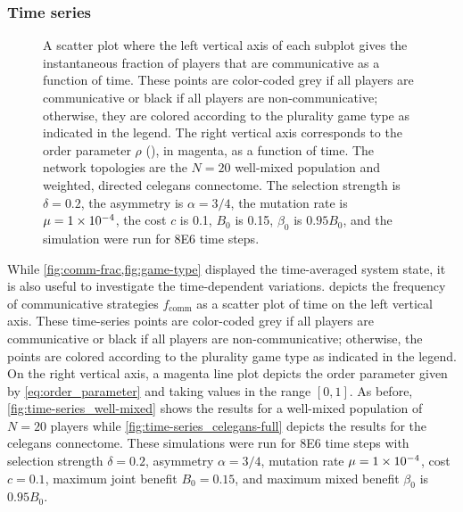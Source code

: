 \documentclass[pdflatex,lineno,referee,sn-mathphys-ay]{sn-jnl}
\begin{document}
\subsubsection{Time series}
\begin{figure}
  \centering
  
  \caption{
    A scatter plot where
    the left vertical axis of each subplot gives
    the instantaneous fraction of players that are communicative
    as a function of time.
    These points are color-coded
    grey if all players are communicative or
    black if all players are non-communicative;
    otherwise, they are colored according
    to the plurality game type as indicated in the legend.
    The right vertical axis corresponds to the order parameter $\rho$
    (), in magenta, as a function of time.
    The network topologies are the
    $N=20$ well-mixed population
    and
    weighted, directed \gls{celegans} connectome.
    The selection strength is $\delta=0.2$,
    the asymmetry is $\alpha=3/4$,
    the mutation rate is $\mu=\num{1E-4}$,
    the cost $c$ is \num{0.1},
    $B_0$ is \num{0.15},
    $\beta_0$ is $\num{0.95} B_0$,
    and the simulation were run for \num{8E6} time steps.
  }
  \label{fig:time-series}
\end{figure}

While \cref{fig:comm-frac,fig:game-type} displayed
the time-averaged system state,
it is also useful to investigate the time-dependent variations.
 depicts the frequency
of communicative strategies $f_{\text{comm}}$
as a scatter plot of time on the left vertical axis.
These time-series points are color-coded
grey if all players are communicative or
black if all players are non-communicative;
otherwise, the points are colored according
to the plurality game type as indicated in the legend.
On the right vertical axis,
a magenta line plot depicts the order parameter
given by \cref{eq:order_parameter} and
taking values in the range $[0,1]$.
As before, \cref{fig:time-series_well-mixed} shows the results
for a well-mixed population of $N=20$ players
while \cref{fig:time-series_celegans-full} depicts the results
for the \gls{celegans} connectome.
These simulations were run
for \num{8E6} time steps with
selection strength $\delta = 0.2$,
asymmetry $\alpha = 3/4$,
mutation rate $\mu=\num{1E-4}$,
cost $c = \num{0.1}$,
maximum joint benefit $B_0 = 0.15$,
and maximum mixed benefit $\beta_0$ is $\num{0.95} B_0$.
\end{document}
